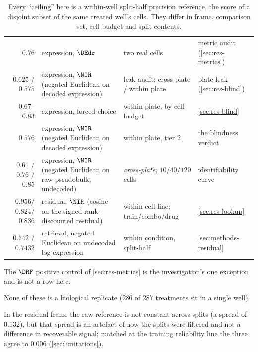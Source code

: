 \begin{table}[htbp]
\caption{ Every ``ceiling'' here is a
within-well split-half precision reference, the score of a disjoint subset of
the same treated well's cells. They differ in frame, comparison set, cell budget
and split contents.}
\label{tab:ceilings}
\begin{fullwidth}
\begin{threeparttable}
\begin{tabularx}{\linewidth}{@{}r L{61mm} L{48mm} Y@{}}
 &  & 
  &  \\
\midrule
$0.76$ & expression, $\DEdr$ & two real cells & metric audit
  (\cref{sec:res-metrics}) \\
\addlinespace
$0.625$ / $0.575$ & expression, $\NIR$ (negated Euclidean on decoded expression)
  & leak audit; cross-plate / within plate
  & plate leak (\cref{sec:res-blind}) \\
\addlinespace
$0.67$--$0.83$ & expression, forced choice & within plate, by cell budget
  & \cref{sec:res-blind} \\
\addlinespace
$0.576$ & expression, $\NIR$ (negated Euclidean on decoded expression)
  & within plate, tier 2 & the blindness verdict \\
\addlinespace
$0.61$ / $0.76$ / $0.85$ & expression, $\NIR$ (negated Euclidean on raw
  pseudobulk, undecoded) & \emph{cross-plate};
  $10$/$40$/$120$ cells & identifiability curve \\
\addlinespace
$0.956$/$0.824$/$0.836$ & residual, $\NIR$ (cosine on the signed rank-discounted
  residual) & within cell line;
  train/combo/drug & \cref{sec:res-lookup} \\
\addlinespace
$0.742$ / $0.7432$ & retrieval, negated Euclidean on undecoded log-expression
  & within condition, split-half
  & \cref{sec:methods-residual} \\
\end{tabularx}
\begin{tablenotes}[flushleft]
\item The $\DRF$ positive control of \cref{sec:res-metrics} is the
investigation's one exception and is not a row here.
\item None of these is a biological replicate ($286$ of $287$ treatments sit in
a single well).
\item In the residual frame the raw reference is not constant across splits (a
spread of $0.132$), but that spread is an artefact of how the splits were
filtered and not a difference in recoverable signal; matched at the training
reliability line the three agree to $0.006$ (\cref{sec:limitations}).
\end{tablenotes}
\end{threeparttable}
\end{fullwidth}
\end{table}

